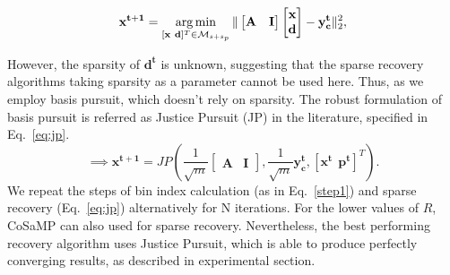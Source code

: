 $$
\mathbf{{x}^{t+1}}=\argmin_{[\mathbf{x~d}]^T \in \mathcal{M}_{s+s_p}}\norm{\begin{bmatrix} \mathbf{A} & \mathbf{I} \end{bmatrix} \begin{bmatrix} \mathbf{x} \\ \mathbf{d} \end{bmatrix} - \mathbf{y^t_c}}_2^2, %
$$

 However, the sparsity of $\mathbf{d^t}$ is unknown, suggesting that the sparse recovery algorithms taking sparsity as a parameter cannot be used here. Thus, as we employ basis pursuit, which doesn't rely on sparsity. The robust formulation of basis pursuit is referred as Justice Pursuit (JP) in the literature, specified in Eq.~\ref{eq:jp}.
\begin{equation}
\implies \mathbf{{x^{t+1}}} = JP(\frac{1}{\sqrt{m}}\begin{bmatrix} \mathbf{A} & \mathbf{I} \end{bmatrix},\frac{1}{\sqrt{m}}\mathbf{y^t_c},[\mathbf{x^t~~p^t}]^T).
\label{eq:jp}
\end{equation}
We repeat the steps of bin index calculation (as in Eq.~\ref{step1}) and sparse recovery (Eq.~\ref{eq:jp}) alternatively for $\mathrm{N}$ iterations. For the lower values of $R$, CoSaMP can also used for sparse recovery. Nevertheless, the best performing recovery algorithm uses Justice Pursuit, which is able to produce perfectly converging results, as described in experimental section.



%
